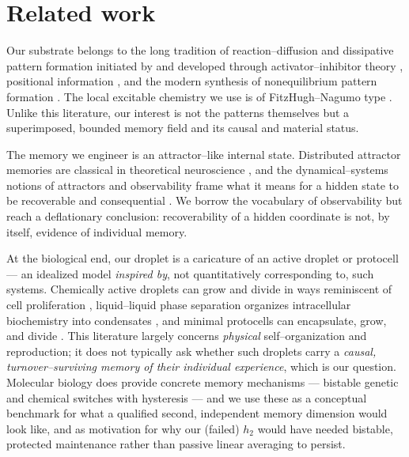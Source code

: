 \documentclass[11pt]{article}
\begin{document}
\section{Related work}
Our substrate belongs to the long tradition of reaction--diffusion and dissipative pattern formation initiated by
\citet{turing1952} and developed through activator--inhibitor theory \citep{gierer1972}, positional information
\citep{wolpert1969}, and the modern synthesis of nonequilibrium pattern formation \citep{cross1993,kondo2010,nicolis1977}.
The local excitable chemistry we use is of FitzHugh--Nagumo type \citep{fitzhugh1961,nagumo1962}. Unlike this
literature, our interest is not the patterns themselves but a superimposed, bounded memory field and its causal and
material status.

The memory we engineer is an attractor--like internal state. Distributed attractor memories are classical in
theoretical neuroscience \citep{hopfield1982}, and the dynamical--systems notions of attractors and observability
frame what it means for a hidden state to be recoverable and consequential \citep{strogatz1994,hermann1977}. We
borrow the vocabulary of observability but reach a deflationary conclusion: recoverability of a hidden coordinate
is not, by itself, evidence of individual memory.

At the biological end, our droplet is a caricature of an active droplet or protocell --- an idealized model \emph{inspired by}, not quantitatively corresponding to, such systems. Chemically active droplets can
grow and divide in ways reminiscent of cell proliferation \citep{zwicker2017}, liquid--liquid phase separation
organizes intracellular biochemistry into condensates \citep{brangwynne2009,hyman2014,banani2017}, and minimal
protocells can encapsulate, grow, and divide \citep{szostak2001,hanczyc2003}. This literature largely concerns
\emph{physical} self--organization and reproduction; it does not typically ask whether such droplets carry a
\emph{causal, turnover--surviving memory of their individual experience}, which is our question. Molecular biology
does provide concrete memory mechanisms --- bistable genetic and chemical switches with hysteresis
\citep{gardner2000,elowitz2000,ferrell2002,ptashne2004} --- and we use these as a conceptual benchmark for what a
qualified second, independent memory dimension would look like, and as motivation for why our (failed) $h_2$ would
have needed bistable, protected maintenance rather than passive linear averaging to persist.
\end{document}

